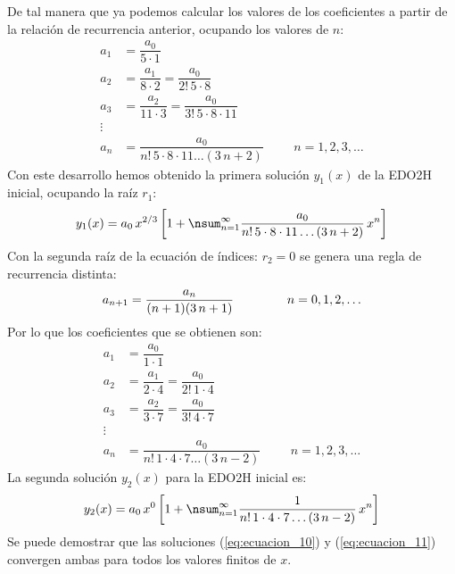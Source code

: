 De tal manera que ya podemos calcular los valores de los coeficientes a partir de la relación de recurrencia anterior, ocupando los valores de $n$:
\begin{align*}
a_{1} &= \dfrac{a_{0}}{5 \cdot 1} \\[0.5em]
a_{2} &= \dfrac{a_{1}}{8 \cdot 2} = \dfrac{a_{0}}{2! \, 5 \cdot 8} \\[0.5em]
a_{3} &= \dfrac{a_{2}}{11 \cdot 3} = \dfrac{a_{0}}{3! \, 5 \cdot 8 \cdot 11} \\
\vdots \\[0.5em]
a_{n} &= \dfrac{a_{0}}{n! \, 5 \cdot 8 \cdot 11 \ldots (3\, n + 2)} \hspace{1cm} n = 1, 2, 3, \ldots
\end{align*}
Con este desarrollo hemos obtenido la primera solución $y_{1}(x)$ de la EDO2H inicial, ocupando la raíz $r_{1}$:
\begin{align}
y_{1} (x)= a_{0} \, x^{2/3} \left[ 1 + \nsum_{n=1}^{\infty} \dfrac{a_{0}}{n! \, 5 \cdot 8 \cdot 11 \ldots (3\, n + 2)} \, x^{n} \right]
\label{eq:ecuacion_10}    
\end{align}
Con la segunda raíz de la ecuación de índices: $r_{2} = 0$ se genera una regla de recurrencia distinta:
\begin{align}
a_{n+1} = \dfrac{a_{n}}{(n+1)(3 \, n + 1)} \hspace{1.5cm} n = 0, 1, 2, \ldots
\label{eq:ecuacion_09}    
\end{align}
Por lo que los coeficientes que se obtienen son:
\begin{align*}
a_{1} &= \dfrac{a_{0}}{1 \cdot 1} \\[0.5em]
a_{2} &= \dfrac{a_{1}}{2 \cdot 4} = \dfrac{a_{0}}{2! \, 1 \cdot 4}  \\[0.5em]
a_{3} &= \dfrac{a_{2}}{3 \cdot 7} = \dfrac{a_{0}}{3! \, 4 \cdot 7}  \\[0.5em]
\vdots \\
a_{n} &= \dfrac{a_{0}}{n! \, 1 \cdot 4 \cdot 7 \ldots (3 \, n - 2)} \hspace{1cm} n = 1, 2, 3, \ldots
\end{align*}
La segunda solución $y_{2}(x)$ para la EDO2H inicial es:
\begin{align}
y_{2} (x)= a_{0} \, x^{0} \left[ 1 + \nsum_{n=1}^{\infty} \dfrac{1}{n! \, 1 \cdot 4 \cdot 7 \ldots (3\, n - 2)} \, x^{n} \right]
\label{eq:ecuacion_11}
\end{align}    
Se puede demostrar que las soluciones (\ref{eq:ecuacion_10}) y (\ref{eq:ecuacion_11}) convergen ambas para todos los valores finitos de $x$.
